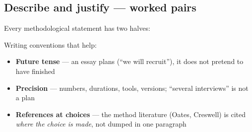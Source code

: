 \documentclass[11pt,a4paper,british,twoside=false,headings=small,chapterprefix=false,numbers=noenddot]{scrbook}
\begin{document}
\subsection{Describe and justify --- worked pairs}
\begin{center}\small
\small
  Every methodological statement has two halves:
  
  \begin{center}
  \end{center}
  
  Writing conventions that help:
  \begin{itemize}\setlength{\itemsep}{0.3em}
    \item \textbf{Future tense} --- an essay plans (``we will recruit''),
          it does not pretend to have finished
    \item \textbf{Precision} --- numbers, durations, tools, versions;
          ``several interviews'' is not a plan
    \item \textbf{References at choices} --- the method literature (Oates,
          Creswell) is cited \emph{where the choice is made}, not dumped in
          one paragraph
  \end{itemize}
\end{center}
\end{document}
